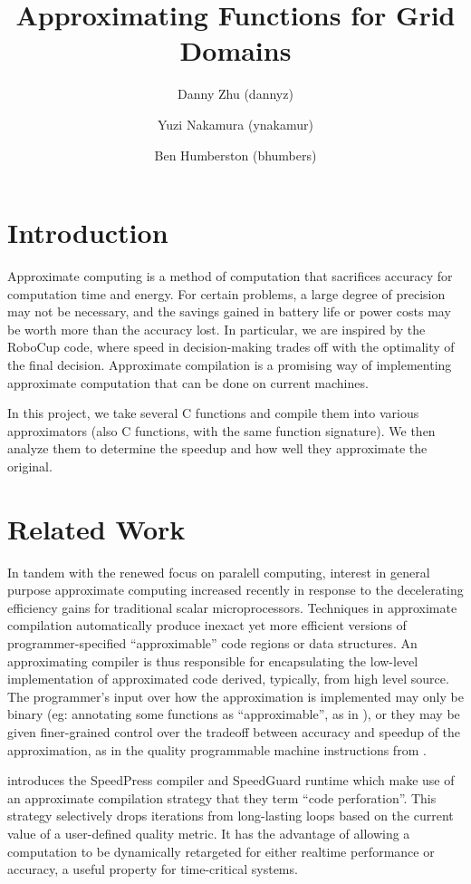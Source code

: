 \documentclass{article}
\begin{document}
\title{Approximating Functions for Grid Domains}
\author{Danny Zhu (dannyz) \and Yuzi Nakamura (ynakamur) \and Ben Humberston (bhumbers)}

\maketitle

\section{Introduction}

Approximate computing is a method of computation that sacrifices accuracy for computation time and energy. For certain problems, a large degree of precision may not be necessary, and the savings gained in battery life or power costs may be worth more than the accuracy lost. In particular, we are inspired by the RoboCup code, where speed in decision-making trades off with the optimality of the final decision. Approximate compilation is a promising way of implementing approximate computation that can be done on current machines.

In this project, we take several C functions and compile them into various approximators (also C functions, with the same function signature). We then analyze them to determine the speedup and how well they approximate the original.

\section{Related Work}
In tandem with the renewed focus on paralell computing, interest in general purpose approximate computing increased recently in response to the decelerating efficiency gains for traditional scalar microprocessors. Techniques in approximate compilation automatically produce inexact yet more efficient versions of programmer-specified ``approximable'' code regions or data structures. An approximating compiler is thus responsible for encapsulating the low-level implementation of approximated code derived, typically, from high level source. The programmer's input over how the approximation is implemented may only be binary (eg: annotating some functions as ``approximable'', as in \cite{Esmaeilzadeh12}), or they may be given finer-grained control over the tradeoff between accuracy and speedup of the approximation, as in the quality programmable machine instructions from \cite{Venkataramani13}.

\cite{Agarwal09} introduces the SpeedPress compiler and SpeedGuard runtime which make use of an approximate compilation strategy that they term ``code perforation''. This strategy selectively drops iterations from long-lasting loops based on the current value of a user-defined quality metric. It has the advantage of allowing a computation to be dynamically retargeted for either realtime performance or accuracy, a useful property for time-critical systems.
\end{document}
